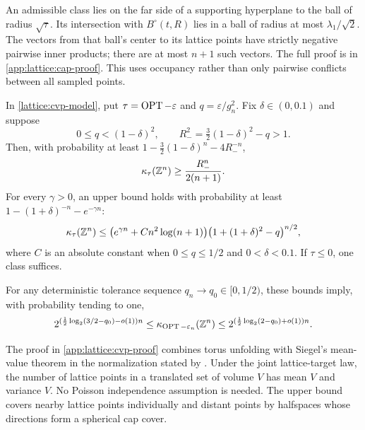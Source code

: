 An admissible class lies on the far side of a supporting hyperplane to the
ball of radius $\sqrt\tau$. Its intersection with $B^\circ(t,R)$ lies in
a ball of radius at most $\lambda_1/\sqrt2$. The vectors from that ball's
center to its lattice points have strictly negative pairwise inner
products; there are at most $n+1$ such vectors. The full proof is in
\cref{app:lattice:cap-proof}. This uses occupancy rather than only pairwise
conflicts between all sampled points.

\begin{theorem}
\label{lattice:cvp}
In \eqref{lattice:cvp-model}, put $\tau=\operatorname{OPT}-\varepsilon$ and
$q=\varepsilon/g_n^2$. Fix $\delta\in(0,0.1)$ and suppose
\begin{equation*}
 0\le q<(1-\delta)^2,
 \qquad R_-^2=\tfrac32(1-\delta)^2-q>1.
\end{equation*}
Then, with probability at least
$1-\tfrac32(1-\delta)^n-4R_-^{-n}$,
\begin{equation}
 \kappa_\tau(\mathbb{Z}^n)\ge\frac{R_-^n}{2(n+1)}.
 \label{lattice:cvp-lower}
\end{equation}
For every $\gamma>0$, an upper bound holds with probability at least
$1-(1+\delta)^{-n}-e^{-\gamma n}$:
\begin{equation}
 \kappa_\tau(\mathbb{Z}^n)
 \le \bigl(e^{\gamma n}+C n^2\log(n+1)\bigr)
       \bigl(1+(1+\delta)^2-q\bigr)^{n/2},
 \label{lattice:cvp-upper}
\end{equation}
where $C$ is an absolute constant when $0\le q\le1/2$ and
$0<\delta<0.1$. If $\tau\le0$, one class suffices.

For any deterministic tolerance sequence $q_n\to q_0\in[0,1/2)$, these
bounds imply, with probability tending to one,
\begin{equation}
 2^{(\frac12\log_2(3/2-q_0)-o(1))n}
 \le\kappa_{\operatorname{OPT}-\varepsilon_n}(\mathbb{Z}^n)
 \le2^{(\frac12\log_2(2-q_0)+o(1))n}.
 \label{lattice:cvp-exponents}
\end{equation}
\end{theorem}

The proof in \cref{app:lattice:cvp-proof} combines torus unfolding with
Siegel's mean-value theorem in the normalization stated by
\citet{skenderi2021RandomLatticesSiegel}. Under the joint lattice-target law, the number
of lattice points in a translated set of volume $V$ has mean $V$ and
variance $V$. No Poisson independence assumption is needed. The upper
bound covers nearby lattice points individually and distant points by
halfspaces whose directions form a spherical cap cover.

